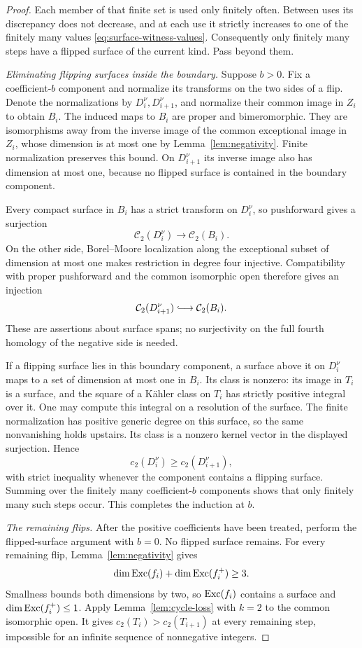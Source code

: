 \begin{proof}
Each member of that finite set is used only finitely often.  Between
uses its discrepancy does not decrease, and at each use it strictly
increases to one of the finitely many values
\eqref{eq:surface-witness-values}.  Consequently only finitely many
steps have a flipped surface of the current kind.  Pass beyond them.

\smallskip\noindent
\emph{Eliminating flipping surfaces inside the boundary.}
Suppose $b>0$.  Fix a coefficient-$b$ component and normalize its
transforms on the two sides of a flip.  Denote the normalizations by
$D_i^\nu,D_{i+1}^\nu$, and normalize their common image in $Z_i$ to
obtain $B_i$.  The induced maps to $B_i$ are proper and bimeromorphic.
They are isomorphisms away from the inverse image of the common
exceptional image in $Z_i$, whose dimension is at most one by
Lemma~\ref{lem:negativity}.  Finite normalization preserves this bound.
On $D_{i+1}^\nu$ its inverse image also has dimension at most one,
because no flipped surface is contained in the boundary component.

Every compact surface in $B_i$ has a strict transform on $D_i^\nu$,
so pushforward gives a surjection
\[
 \mathcal C_2(D_i^\nu)\longrightarrow\mathcal C_2(B_i).
\]
On the other side, Borel--Moore localization along the exceptional
subset of dimension at most one makes restriction in degree four
injective.  Compatibility with proper pushforward and the common
isomorphic open therefore gives an injection
\[
 \mathcal C_2(D_{i+1}^\nu)\lhook\joinrel\longrightarrow
 \mathcal C_2(B_i).
\]
These are assertions about surface spans; no surjectivity on the full
fourth homology of the negative side is needed.

If a flipping surface lies in this boundary component, a surface above
it on $D_i^\nu$ maps to a set of dimension at most one in $B_i$.
Its class is nonzero: its image in $T_i$ is a surface, and the square
of a K\"ahler class on $T_i$ has strictly positive integral over it.
One may compute this integral on a resolution of the surface.
The finite normalization has positive generic degree on this surface,
so the same nonvanishing holds upstairs.  Its class is a nonzero
kernel vector in the displayed surjection.  Hence
\[
 c_2(D_i^\nu)\geq c_2(D_{i+1}^\nu),
\]
with strict inequality whenever the component contains a flipping
surface.  Summing over the finitely many coefficient-$b$ components
shows that only finitely many such steps occur.  This completes the
induction at $b$.

\smallskip\noindent
\emph{The remaining flips.}
After the positive coefficients have been treated, perform the
flipped-surface argument with $b=0$.  No flipped surface remains.
For every remaining flip, Lemma~\ref{lem:negativity} gives
\[
 \dim\operatorname{Exc}(f_i)+\dim\operatorname{Exc}(f_i^+)\geq3.
\]
Smallness bounds both dimensions by two, so $\operatorname{Exc}(f_i)$ contains a
surface and $\dim\operatorname{Exc}(f_i^+)\leq1$.  Apply
Lemma~\ref{lem:cycle-loss} with $k=2$ to the common isomorphic open.
It gives $c_2(T_i)>c_2(T_{i+1})$ at every remaining step, impossible
for an infinite sequence of nonnegative integers.
\end{proof}

